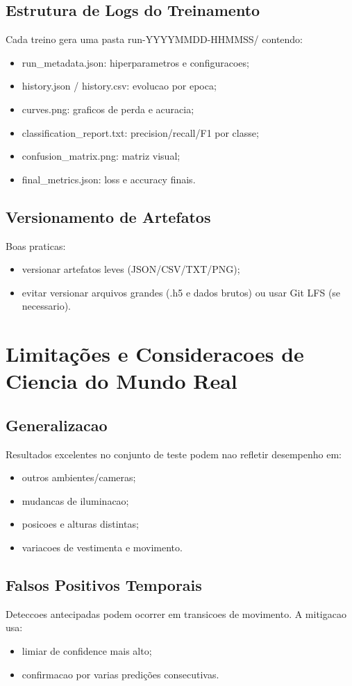 \subsection{Estrutura de Logs do Treinamento}
Cada treino gera uma pasta run-YYYYMMDD-HHMMSS/ contendo:
\begin{itemize}
  \item run\_metadata.json: hiperparametros e configuracoes;
  \item history.json / history.csv: evolucao por epoca;
  \item curves.png: graficos de perda e acuracia;
  \item classification\_report.txt: precision/recall/F1 por classe;
  \item confusion\_matrix.png: matriz visual;
  \item final\_metrics.json: loss e accuracy finais.
\end{itemize}

\subsection{Versionamento de Artefatos}
Boas praticas:
\begin{itemize}
  \item versionar artefatos leves (JSON/CSV/TXT/PNG);
  \item evitar versionar arquivos grandes (.h5 e dados brutos) ou usar Git LFS (se necessario).
\end{itemize}

\section{Limitações e Consideracoes de Ciencia do Mundo Real}

\subsection{Generalizacao}
Resultados excelentes no conjunto de teste podem nao refletir desempenho em:
\begin{itemize}
  \item outros ambientes/cameras;
  \item mudancas de iluminacao;
  \item posicoes e alturas distintas;
  \item variacoes de vestimenta e movimento.
\end{itemize}

\subsection{Falsos Positivos Temporais}
Deteccoes antecipadas podem ocorrer em transicoes de movimento. A mitigacao usa:
\begin{itemize}
  \item limiar de confidence mais alto;
  \item confirmacao por varias predições consecutivas.
\end{itemize}

